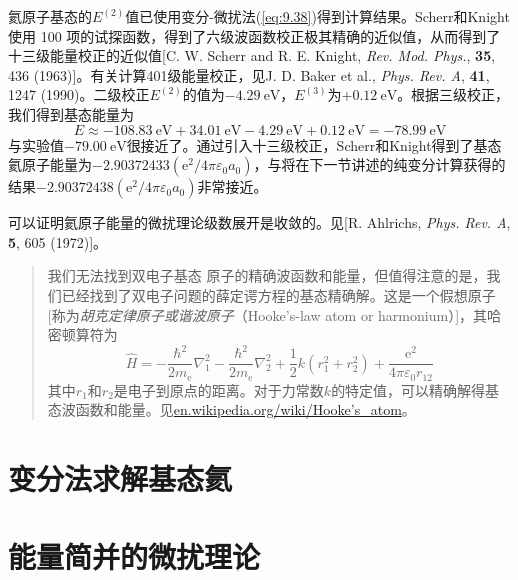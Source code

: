     氦原子基态的$E^{\left(2\right)}$值已使用变分-微扰法(\ref{eq:9.38})得到计算结果。Scherr和Knight使用 100 项的试探函数，得到了六级波函数校正极其精确的近似值，从而得到了十三级能量校正的近似值[C. W. Scherr and R. E. Knight, \textit{Rev. Mod. Phys.}, \textbf{35}, 436 (1963)]。有关计算401级能量校正，见J. D. Baker et al., \textit{Phys. Rev. A}, \textbf{41}, 1247 (1990)。二级校正$E^{\left(2\right)}$的值为$-4.29 \: \mathrm{eV}$，$E^{\left(3\right)}$为$+0.12 \: \mathrm{eV}$。根据三级校正，我们得到基态能量为
    \begin{equation*}
        E \approx -108.83 \: \mathrm{eV} + 34.01 \: \mathrm{eV} - 4.29 \: \mathrm{eV} + 0.12 \: \mathrm{eV} = -78.99 \: \mathrm{eV}
    \end{equation*}
    与实验值$-79.00 \: \mathrm{eV}$很接近了。通过引入十三级校正，Scherr和Knight得到了基态氦原子能量为$-2.90372433 \left(\mathrm{e}^2 / 4\pi\varepsilon_0a_0\right)$，与将在下一节讲述的纯变分计算获得的结果$-2.90372438 \left(\mathrm{e}^2 / 4\pi\varepsilon_0a_0\right)$非常接近。

    可以证明氦原子能量的微扰理论级数展开是收敛的。见[R. Ahlrichs, \textit{Phys. Rev. A}, \textbf{5}, 605 (1972)]。

    \begin{quote}
        \small
        \noindent 我们无法找到双电子基态  原子的精确波函数和能量，但值得注意的是，我们已经找到了双电子问题的薛定谔方程的基态精确解。这是一个假想原子[称为\textit{胡克定律原子或谐波原子}（Hooke's-law atom or harmonium）]，其哈密顿算符为
        \begin{equation*}
            \hat{H} = -\frac{\hbar^2}{2m_{\mathrm{e}}}\nabla_1^2 - \frac{\hbar^2}{2m_{\mathrm{e}}}\nabla_2^2 + \frac{1}{2}k\left(r_1^2 + r_2^2\right) + \frac{\mathrm{e}^2}{4\pi\varepsilon_0r_{12}}
        \end{equation*}
        其中$r_1$和$r_2$是电子到原点的距离。对于力常数$k$的特定值，可以精确解得基态波函数和能量。见\url{en.wikipedia.org/wiki/Hooke’s_atom}。
    \end{quote}








\section{变分法求解基态氦}
\label{sec:9.4 Variational Treatments of the Ground State of Helium}

\section{能量简并的微扰理论}
\label{sec:9.5 Perturbation Theory for a Degenerate Energy Level}

